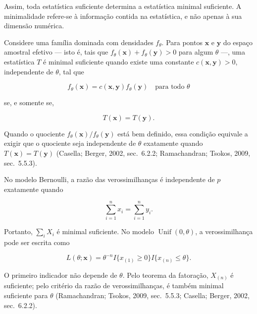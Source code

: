 \documentclass[
  letterpaper,
  DIV=11,
  numbers=noendperiod]{scrreprt}
\begin{document}
Assim, toda estatística suficiente determina a estatística minimal
suficiente. A minimalidade refere-se à informação contida na
estatística, e não apenas à sua dimensão numérica.

\begin{tcolorbox}[enhanced jigsaw, colback=white, leftrule=.75mm, colbacktitle=quarto-callout-important-color!10!white, breakable, titlerule=0mm, bottomtitle=1mm, title=\textcolor{quarto-callout-important-color}{\faExclamation}\hspace{0.5em}{Critério da razão de verossimilhanças}, colframe=quarto-callout-important-color-frame, toprule=.15mm, opacityback=0, bottomrule=.15mm, opacitybacktitle=0.6, arc=.35mm, toptitle=1mm, rightrule=.15mm, coltitle=black, left=2mm]

Considere uma família dominada com densidades \(f_\theta\). Para pontos
\(\mathbf{x}\) e \(\mathbf{y}\) do espaço amostral efetivo --- isto é,
tais que \(f_\theta(\mathbf{x})+f_\theta(\mathbf{y})>0\) para algum
\(\theta\) ---, uma estatística \(T\) é minimal suficiente quando existe
uma constante \(c(\mathbf{x},\mathbf{y})>0\), independente de
\(\theta\), tal que

\[f_\theta(\mathbf{x})
=
c(\mathbf{x},\mathbf{y})f_\theta(\mathbf{y})
\quad\text{para todo }\theta\]

se, e somente se,

\[T(\mathbf{x})=T(\mathbf{y}).\]

Quando o quociente \(f_\theta(\mathbf{x})/f_\theta(\mathbf{y})\) está
bem definido, essa condição equivale a exigir que o quociente seja
independente de \(\theta\) exatamente quando
\(T(\mathbf{x})=T(\mathbf{y})\) (Casella; Berger, 2002, sec.~6.2.2;
Ramachandran; Tsokos, 2009, sec.~5.5.3).

\end{tcolorbox}

No modelo Bernoulli, a razão das verossimilhanças é independente de
\(p\) exatamente quando

\[\sum_{i=1}^n x_i
=
\sum_{i=1}^n y_i.\]

Portanto, \(\sum_iX_i\) é minimal suficiente. No modelo
\(\operatorname{Unif}(0,\theta)\), a verossimilhança pode ser escrita
como

\[L(\theta;\mathbf{x})
=
\theta^{-n}
I\{x_{(1)}\geq0\}
I\{x_{(n)}\leq\theta\}.\]

O primeiro indicador não depende de \(\theta\). Pelo teorema da
fatoração, \(X_{(n)}\) é suficiente; pelo critério da razão de
verossimilhanças, é também minimal suficiente para \(\theta\)
(Ramachandran; Tsokos, 2009, sec.~5.5.3; Casella; Berger, 2002,
sec.~6.2.2).
\end{document}

